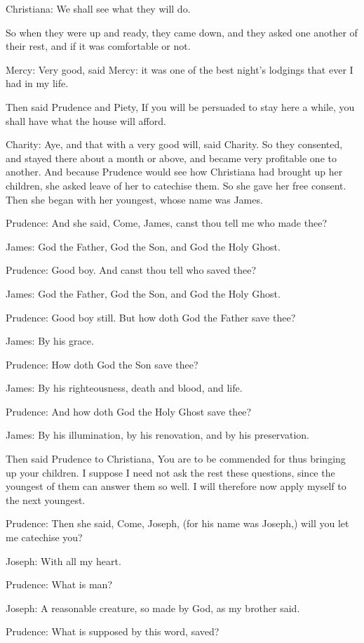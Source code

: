 Christiana: We shall see what they will do.

So when they were up and ready, they came down, and they asked one another of their rest, and if it was comfortable or not.

Mercy: Very good, said Mercy: it was one of the best night's lodgings that ever I had in my life.

Then said Prudence and Piety, If you will be persuaded to stay here a while, you shall have what the house will afford.

Charity: Aye, and that with a very good will, said Charity. So they consented, and stayed there about a month or above, and became very profitable one to another. And because Prudence would see how Christiana had brought up her children, she asked leave of her to catechise them. So she gave her free consent. Then she began with her youngest, whose name was James.

Prudence: And she said, Come, James, canst thou tell me who made thee?

James: God the Father, God the Son, and God the Holy Ghost.

Prudence: Good boy. And canst thou tell who saved thee?

James: God the Father, God the Son, and God the Holy Ghost.

Prudence: Good boy still. But how doth God the Father save thee?

James: By his grace.

Prudence: How doth God the Son save thee?

James: By his righteousness, death and blood, and life.

Prudence: And how doth God the Holy Ghost save thee?

James: By his illumination, by his renovation, and by his preservation.

Then said Prudence to Christiana, You are to be commended for thus bringing up your children. I suppose I need not ask the rest these questions, since the youngest of them can answer them so well. I will therefore now apply myself to the next youngest.

Prudence: Then she said, Come, Joseph, (for his name was Joseph,) will you let me catechise you?

Joseph: With all my heart.

Prudence: What is man?

Joseph: A reasonable creature, so made by God, as my brother said.

Prudence: What is supposed by this word, saved?

